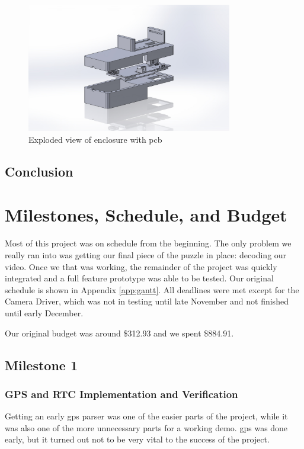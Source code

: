\documentclass[12pt]{article}
\begin{document}
\begin{figure}[h]
    \centering
    \includegraphics[width=0.8\textwidth]{exploded_enclosure}
    \caption{Exploded view of enclosure with \gls{pcb}}
    \label{fig:exploded_enclosure}
\end{figure}

\subsection{Conclusion}

\section{Milestones, Schedule, and Budget}
Most of this project was on schedule from the beginning. The only problem we
really ran into was getting our final piece of the puzzle in place: decoding
our video. Once we that was working, the remainder of the project was quickly
integrated and a full feature prototype was able to be tested. Our original
schedule is shown in Appendix \ref{app:gantt}. All deadlines were met except
for the Camera Driver, which was not in testing until late November and not
finished until early December.

Our original budget was around \$312.93 and we spent \$884.91. %

\subsection{Milestone 1}
\subsubsection{GPS and RTC Implementation and Verification}
Getting an early \gls{gps} parser was one of the easier parts of the project, while
it was also one of the more unnecessary parts for a working demo. \gls{gps} was done
early, but it turned out not to be very vital to the success of the project.
\end{document}
